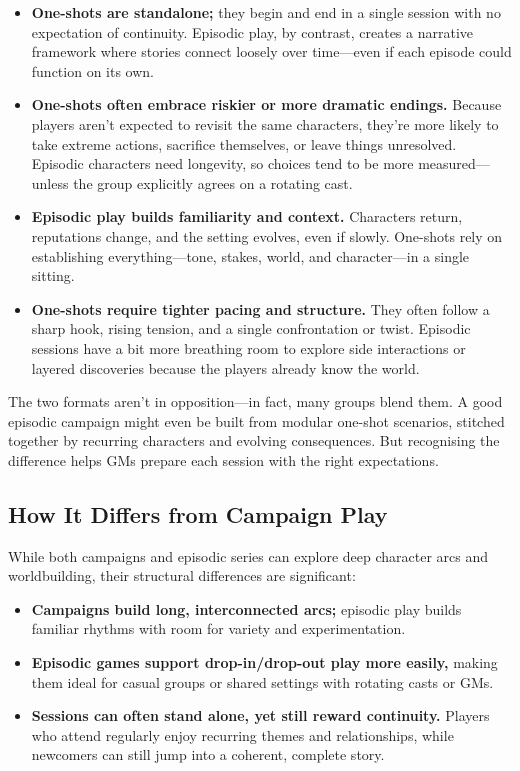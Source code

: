 \begin{itemize}
    \item \textbf{One-shots are standalone;} they begin and end in a single session with no expectation of continuity. Episodic play, by contrast, creates a narrative framework where stories connect loosely over time—even if each episode could function on its own.

    \item \textbf{One-shots often embrace riskier or more dramatic endings.} Because players aren’t expected to revisit the same characters, they’re more likely to take extreme actions, sacrifice themselves, or leave things unresolved. Episodic characters need longevity, so choices tend to be more measured—unless the group explicitly agrees on a rotating cast.

    \item \textbf{Episodic play builds familiarity and context.} Characters return, reputations change, and the setting evolves, even if slowly. One-shots rely on establishing everything—tone, stakes, world, and character—in a single sitting.

    \item \textbf{One-shots require tighter pacing and structure.} They often follow a sharp hook, rising tension, and a single confrontation or twist. Episodic sessions have a bit more breathing room to explore side interactions or layered discoveries because the players already know the world.
\end{itemize}

The two formats aren’t in opposition—in fact, many groups blend them. A good episodic campaign might even be built from modular one-shot scenarios, stitched together by recurring characters and evolving consequences. But recognising the difference helps GMs prepare each session with the right expectations.


\subsection*{How It Differs from Campaign Play}

While both campaigns and episodic series can explore deep character arcs and worldbuilding, their structural differences are significant:

\begin{itemize}
    \item \textbf{Campaigns build long, interconnected arcs;} episodic play builds familiar rhythms with room for variety and experimentation.
    
    \item \textbf{Episodic games support drop-in/drop-out play more easily,} making them ideal for casual groups or shared settings with rotating casts or GMs.

    \item \textbf{Sessions can often stand alone, yet still reward continuity.} Players who attend regularly enjoy recurring themes and relationships, while newcomers can still jump into a coherent, complete story.
\end{itemize}

